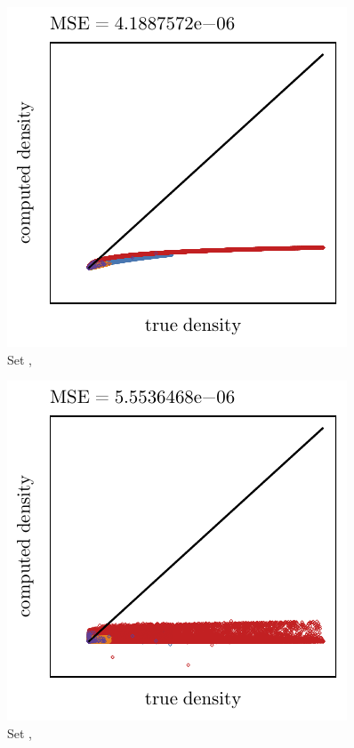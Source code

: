 \begin{subfigure}{0.23\textwidth}
	\centering
	\includegraphics[keepaspectratio=true, width=\textwidth, height=0.23\textheight]{4/img/results_baakman_3_120000_mbe_silverman}
	\caption{Set \baakmanThree, \mbe}
	\label{fig:4:results:mbe:baakman3}
\end{subfigure}	
\begin{subfigure}{0.23\textwidth}
	\centering
	\includegraphics[keepaspectratio=true, width=\textwidth, height=0.23\textheight]{4/img/results_baakman_3_120000_sambe_silverman}
	\caption{Set \baakmanThree, \sambe}
	\label{fig:4:results:sambe:baakman3}
\end{subfigure}	